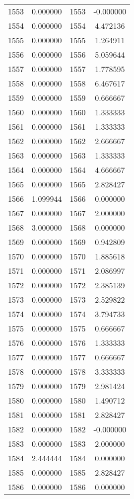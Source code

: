 \documentclass[12pt]{article}
\begin{document}
\begin{longtable}{@{}cccc@{}}
1553 & 0.000000 & 1553 & -0.000000 \\
1554 & 0.000000 & 1554 & 4.472136 \\
1555 & 0.000000 & 1555 & 1.264911 \\
1556 & 0.000000 & 1556 & 5.059644 \\
1557 & 0.000000 & 1557 & 1.778595 \\
1558 & 0.000000 & 1558 & 6.467617 \\
1559 & 0.000000 & 1559 & 0.666667 \\
1560 & 0.000000 & 1560 & 1.333333 \\
1561 & 0.000000 & 1561 & 1.333333 \\
1562 & 0.000000 & 1562 & 2.666667 \\
1563 & 0.000000 & 1563 & 1.333333 \\
1564 & 0.000000 & 1564 & 4.666667 \\
1565 & 0.000000 & 1565 & 2.828427 \\
1566 & 1.099944 & 1566 & 0.000000 \\
1567 & 0.000000 & 1567 & 2.000000 \\
1568 & 3.000000 & 1568 & 0.000000 \\
1569 & 0.000000 & 1569 & 0.942809 \\
1570 & 0.000000 & 1570 & 1.885618 \\
1571 & 0.000000 & 1571 & 2.086997 \\
1572 & 0.000000 & 1572 & 2.385139 \\
1573 & 0.000000 & 1573 & 2.529822 \\
1574 & 0.000000 & 1574 & 3.794733 \\
1575 & 0.000000 & 1575 & 0.666667 \\
1576 & 0.000000 & 1576 & 1.333333 \\
1577 & 0.000000 & 1577 & 0.666667 \\
1578 & 0.000000 & 1578 & 3.333333 \\
1579 & 0.000000 & 1579 & 2.981424 \\
1580 & 0.000000 & 1580 & 1.490712 \\
1581 & 0.000000 & 1581 & 2.828427 \\
1582 & 0.000000 & 1582 & -0.000000 \\
1583 & 0.000000 & 1583 & 2.000000 \\
1584 & 2.444444 & 1584 & 0.000000 \\
1585 & 0.000000 & 1585 & 2.828427 \\
1586 & 0.000000 & 1586 & 0.000000 \\

\end{longtable}
\end{document}
